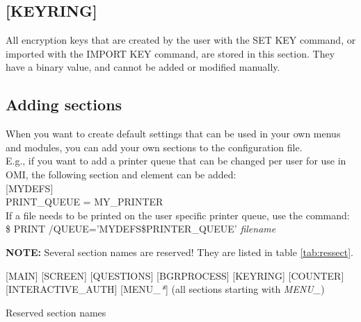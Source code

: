 \documentclass[a4paper]{book}
\newcommand{\vs}{\vspace{3mm}}
\renewcommand{\indent}{\hspace*{5mm}}
\begin{document}
\subsection{[KEYRING]}
\label{subsubsec:mylabel20}

All encryption keys that are created by the user with the \textsf{SET KEY} command, 
or imported with the \textsf{IMPORT KEY} command, are stored in this section. They 
have a binary value, and cannot be added or modified manually.

\subsection{Adding sections}
\label{subsubsec:adding}

When you want to create default settings that can be used in your own menus 
and modules, you can add your own sections to the configuration file. \\
E.g., if you want to add a printer queue that can be changed per user for 
use in OMI, the following section and element can be added: \\
\indent\textsf{[MYDEFS]} \\
\indent\indent\textsf{PRINT{\_}QUEUE = MY{\_}PRINTER} \\
If a file needs to be printed on the user specific printer queue, use the command: \\
\indent\textsf{{\$} PRINT /QUEUE='MYDEFS{\$}PRINTER{\_}QUEUE' \textit{filename}}

\vs

\hspace{-8mm}\textbf{NOTE:} Several section names are reserved! They are listed in table 
\ref{tab:ressect}.

\begin{table}[h!tb]
\begin{minipage}[h!tb]{\textwidth}
\noindent\textsf{[MAIN]} \newline
\textsf{[SCREEN]} \newline
\textsf{[QUESTIONS]} \newline
\textsf{[BGRPROCESS]} \newline
\textsf{[KEYRING]} \newline
\textsf{[COUNTER]} \newline
\textsf{[INTERACTIVE{\_}AUTH]} \newline
\textsf{[MENU{\_}\textit{*}]} (all sections starting with \textsl{MENU{\_}}) \newline
\caption{Reserved section names}\label{tab:ressect}
\end{minipage}
\end{table}
\end{document}
